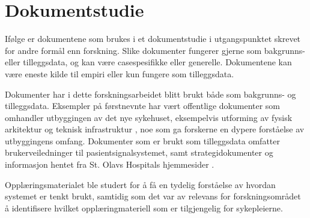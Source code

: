 \section{Dokumentstudie}
\label{sec:dokumentstudie}
Ifølge \citet{Tjora} er dokumentene som brukes i et dokumentstudie i utgangspunktet skrevet for andre formål enn forskning. Slike dokumenter fungerer gjerne som bakgrunns- eller tilleggsdata, og kan være casespesifikke eller generelle. Dokumentene kan være eneste kilde til empiri eller kun fungere som tilleggsdata. 

\noindent
Dokumenter har i dette forskningsarbeidet blitt brukt både som bakgrunns- og tilleggsdata. Eksempler på førstnevnte har vært offentlige dokumenter som omhandler utbyggingen av det nye sykehuset, eksempelvis utforming av fysisk arkitektur \citep{Aslaksen, Sintef-sengetun} og teknisk infrastruktur \citep{TU}, noe som ga forskerne en dypere forståelse av utbyggingens omfang. Dokumenter som er brukt som tilleggsdata omfatter brukerveiledninger til pasientsignalsystemet, samt strategidokumenter og informasjon hentet fra St. Olavs Hospitals hjemmesider \citep{BrukermanualforPasientsignalogPasientsignalapplikasjon, BrukerveiledningforPasientsignal, BrukerveiledningforTradlostelefon, styring13, stolavs}. 

\noindent
Opplæringsmaterialet ble studert for å få en tydelig forståelse av hvordan systemet er tenkt brukt, samtidig som det var av relevans for forskningsområdet å identifisere hvilket opplæringmateriell som er tilgjengelig for sykepleierne.